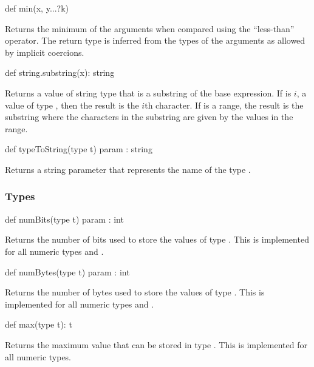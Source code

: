 \begin{protohead}
def min(x, y...?k)
\end{protohead}
\begin{protobody}
Returns the minimum of the arguments when compared using the
``less-than'' operator.  The return type is inferred from the types of
the arguments as allowed by implicit coercions.
\end{protobody}

\begin{protohead}
def string.substring(x): string
\end{protohead}
\begin{protobody}
Returns a value of string type that is a substring of the base
expression.  If  is $i$, a value of type , then the
result is the $i$th character.  If  is a range, the result is
the substring where the characters in the substring are given by the
values in the range.
\end{protobody}

\begin{protohead}
def typeToString(type t) param : string
\end{protohead}
\begin{protobody}
Returns a string parameter that represents the name of the
type .
\end{protobody}

\subsubsection{Types}

\begin{protohead}
def numBits(type t) param : int
\end{protohead}
\begin{protobody}
Returns the number of bits used to store the values of type .
This is implemented for all numeric types and .
\end{protobody}


\begin{protohead}
def numBytes(type t) param : int
\end{protohead}
\begin{protobody}
Returns the number of bytes used to store the values of type .
This is implemented for all numeric types and .
\end{protobody}

\begin{protohead}
def max(type t): t
\end{protohead}
\begin{protobody}
Returns the maximum value that can be stored in type .  This
is implemented for all numeric types.
\end{protobody}

